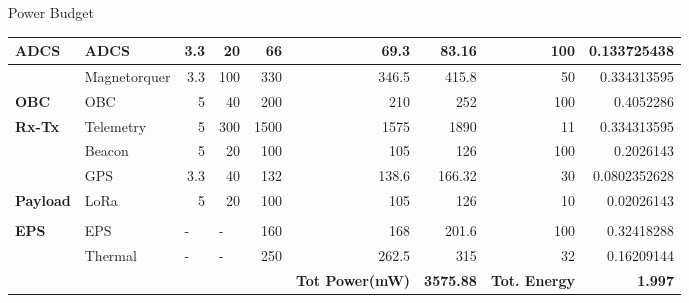 \documentclass[aspectratio=169]{beamer}
\begin{document}
\begin{frame}{Power Budget}
\begin{table}[]
\begin{adjustbox}{width=\columnwidth,center}
\begin{tabular}{|l|l|r|r|r|r|r|r|r|}
					\rowcolor[HTML]{FFE6DD} 
					\textbf{ADCS} &
					ADCS &
					3.3 &
					20 &
					66 &
					69.3 &
					83.16 &
					100 &
					0.133725438 \\ \hline
					\rowcolor[HTML]{FFE6DD} 
					&
					Magnetorquer &
					3.3 &
					100 &
					330 &
					346.5 &
					415.8 &
					50 &
					0.334313595 \\ \hline
					\rowcolor[HTML]{FFE6DD} 
					\textbf{OBC} &
					OBC &
					5 &
					40 &
					200 &
					210 &
					252 &
					100 &
					0.4052286 \\ \hline
					\rowcolor[HTML]{FFE6DD} 
					\textbf{Rx-Tx} &
					Telemetry &
					5 &
					300 &
					1500 &
					1575 &
					1890 &
					11 &
					0.334313595 \\ \hline
					\rowcolor[HTML]{FFE6DD} 
					&
					Beacon &
					5 &
					20 &
					100 &
					105 &
					126 &
					100 &
					0.2026143 \\ \hline
					\rowcolor[HTML]{FFE6DD} 
					&
					GPS &
					3.3 &
					40 &
					132 &
					138.6 &
					166.32 &
					30 &
					0.0802352628 \\ \hline
					\rowcolor[HTML]{FFE6DD} 
					\textbf{Payload} &
					LoRa &
					5 &
					20 &
					100 &
					105 &
					126 &
					10 &
					0.02026143 \\ \hline
					\rowcolor[HTML]{FFE6DD} 
					&
					&
					\multicolumn{1}{l|}{\cellcolor[HTML]{FFE6DD}} &
					\multicolumn{1}{l|}{\cellcolor[HTML]{FFE6DD}} &
					\multicolumn{1}{l|}{\cellcolor[HTML]{FFE6DD}} &
					\multicolumn{1}{l|}{\cellcolor[HTML]{FFE6DD}} &
					\multicolumn{1}{l|}{\cellcolor[HTML]{FFE6DD}} &
					\multicolumn{1}{l|}{\cellcolor[HTML]{FFE6DD}} &
					\multicolumn{1}{l|}{\cellcolor[HTML]{FFE6DD}} \\ \hline
					\rowcolor[HTML]{FFE6DD} 
					\textbf{EPS} &
					EPS &
					\multicolumn{1}{l|}{\cellcolor[HTML]{FFE6DD}-} &
					\multicolumn{1}{l|}{\cellcolor[HTML]{FFE6DD}-} &
					160 &
					168 &
					201.6 &
					100 &
					0.32418288 \\ \hline
					\rowcolor[HTML]{FFE6DD} 
					&
					Thermal &
					\multicolumn{1}{l|}{\cellcolor[HTML]{FFE6DD}-} &
					\multicolumn{1}{l|}{\cellcolor[HTML]{FFE6DD}-} &
					250 &
					262.5 &
					315 &
					32 &
					0.16209144 \\ \hline
					\rowcolor[HTML]{FFE6DD} 
					&
					&
					\multicolumn{1}{l|}{\cellcolor[HTML]{FFE6DD}} &
					\multicolumn{1}{l|}{\cellcolor[HTML]{FFE6DD}} &
					\multicolumn{1}{l|}{\cellcolor[HTML]{FFE6DD}} &
					\multicolumn{1}{l|}{\cellcolor[HTML]{FFE6DD}\textbf{Tot Power(mW)}} &
					\textbf{3575.88} &
					\multicolumn{1}{l|}{\cellcolor[HTML]{FFE6DD}\textbf{Tot. Energy}} &
					\textbf{1.997} \\ \hline
				\end{tabular}
			\end{adjustbox}
		\end{table}
		
		
	\end{frame}
	
\end{document}
